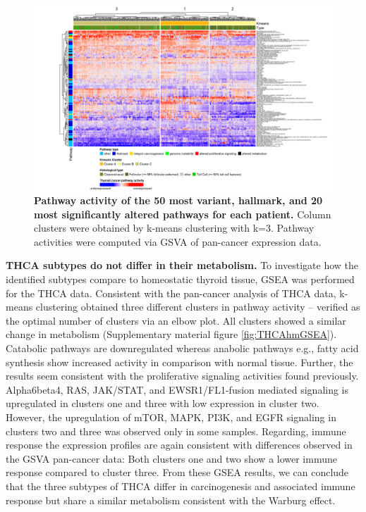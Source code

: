 \documentclass[
  11pt,
  parskip,
  oneside]{scrreprt}
\begin{document}
\begin{figure}

{\centering \includegraphics[width=0.9\linewidth]{figures/THCA Heatmap from Pancancer data top 50 pathways} 

}

\caption{\textbf{Pathway activity of the 50 most variant, hallmark, and 20 most significantly altered pathways for each patient.} Column clusters were obtained by k-means clustering with k=3. Pathway activities were computed via GSVA of pan-cancer expression data.}\label{fig:THCAhm}
\end{figure}

\textbf{THCA subtypes do not differ in their metabolism.} To investigate
how the identified subtypes compare to homeostatic thyroid tissue, GSEA
was performed for the THCA data. Consistent with the pan-cancer analysis
of THCA data, k-means clustering obtained three different clusters in
pathway activity -- verified as the optimal number of clusters via an
elbow plot. All clusters showed a similar change in metabolism
(Supplementary material figure \ref{fig:THCAhmGSEA}). Catabolic pathways
are downregulated whereas anabolic pathways e.g., fatty acid synthesis
show increased activity in comparison with normal tissue. Further, the
results seem consistent with the proliferative signaling activities
found previously. Alpha6beta4, RAS, JAK/STAT, and EWSR1/FL1-fusion
mediated signaling is upregulated in clusters one and three with low
expression in cluster two. However, the upregulation of mTOR, MAPK,
PI3K, and EGFR signaling in clusters two and three was observed only in
some samples. Regarding, immune response the expression profiles are
again consistent with differences observed in the GSVA pan-cancer data:
Both clusters one and two show a lower immune response compared to
cluster three. From these GSEA results, we can conclude that the three
subtypes of THCA differ in carcinogenesis and associated immune response
but share a similar metabolism consistent with the Warburg effect.
\end{document}
